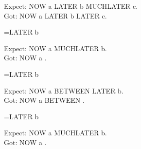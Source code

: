 \documentclass{article}
\begin{document}
\def\now#1{NOW #1}

\def\later#1{LATER #1}
\edef\expanded{\now{a} \later{b} \noexpand\later{c}}
\def\later#1{MUCHLATER #1}

Expect: NOW a LATER b MUCHLATER c.\\
Got: \expanded.

\def\later#1{LATER #1}
\newtoks\tka
\tka={\later{b}}
\edef\expanded{\now{a} \the\tka}
\def\later#1{MUCHLATER #1}

Expect: NOW a MUCHLATER b.\\
Got: \expanded.


\def\later#1{LATER #1}
\newtoks\tka
\tka={\later{b}}
\def\between{BETWEEN }
\edef\expanded{\now{a} \expandafter\between\the\tka}
\def\later#1{MUCHLATER #1}

Expect: NOW a BETWEEN LATER b.\\
Got: \expanded.


\def\later#1{LATER #1}
\newtoks\tka
\tka={\later{b}}
\edef\expanded{\now{a} \expandafter\noexpand\the\tka}
\def\later#1{MUCHLATER #1}

Expect: NOW a MUCHLATER b.\\
Got: \expanded.
\end{document}
